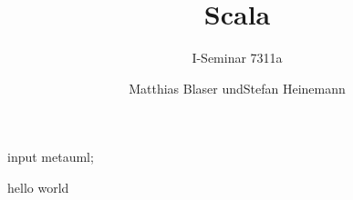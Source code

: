 \documentclass[oneside,DIV12,BCOR0.5cm,bibliography=totoc]{template}
\begin{document}
\begin{empfile}
\begin{empcmds}
input metauml;
\end{empcmds}


\title{Scala}
\subtitle{I-Seminar 7311a}

\author{Matthias Blaser undStefan Heinemann }


hello world

\end{empfile}
\end{document}
